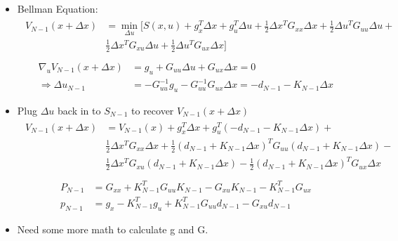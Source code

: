 \begin{itemize}
    \item Bellman Equation:
    \begin{align}
        \begin{split}
        V_{N-1}(x + \Delta x) & = \min_{\Delta u}[S(x, u) + g_x^T \Delta x + g_u^T \Delta u +
                                \frac{1}{2} \Delta x^T G_{xx} \Delta x + 
                                \frac{1}{2} \Delta u^T G_{uu} \Delta u + \\
                                & \frac{1}{2} \Delta x^T G_{xu} \Delta u + 
                                \frac{1}{2} \Delta u^T G_{ux} \Delta x ] \\
        \end{split}
    \end{align}
    \begin{align}
        \nabla_u V_{N-1}(x + \Delta x) & = g_u + G_{uu} \Delta u + G_{ux} \Delta x = 0 \\
        \Rightarrow \Delta u_{N-1} & = -G_{uu}^{-1} g_u - G_{uu}^{-1}G_{ux}\Delta x = -d_{N-1} - K_{N-1} \Delta x
    \end{align}

    \item Plug $\Delta u$ back in to $S_{N-1}$ to recover $V_{N-1}(x + \Delta x)$
    \begin{align}
        \begin{split}
        V_{N-1}(x + \Delta x) &= V_{N-1}(x) + g_x^T \Delta x + g_u^T (-d_{N-1} - K_{N-1} \Delta x) + \\
        &\frac{1}{2} \Delta x^T G_{xx} \Delta x + 
        \frac{1}{2} (d_{N-1} + K_{N-1} \Delta x)^T G_{uu} (d_{N-1} + K_{N-1} \Delta x) - \\
        &\frac{1}{2} \Delta x^T G_{xu} (d_{N-1} + K_{N-1} \Delta x) - 
        \frac{1}{2} (d_{N-1} + K_{N-1} \Delta x)^T G_{ux} \Delta x \\
        \end{split} 
    \end{align}
    \begin{align}
        P_{N-1} & = G_{xx} + K_{N-1}^T G_{uu} K_{N-1} - G_{xu} K_{N-1} - K_{N-1}^T G_{ux} \\
        p_{N-1} & = g_x - K_{N-1}^T g_u + K_{N-1}^T G_{uu} d_{N-1} - G_{xu} d_{N-1}
    \end{align}
    \item Need some more math to calculate g and G.
\end{itemize}

